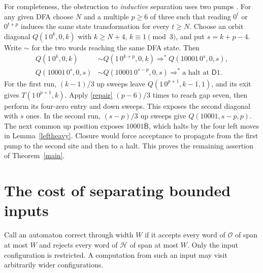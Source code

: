 \documentclass[11pt]{article}
\newcommand{\state}[1]{\mathsf{#1}}
\newcommand{\orb}{\mathcal O}
\newcommand{\halts}{\mathcal H}
\newcommand{\run}{\mathrel{\Rightarrow^{*}}}
\newcommand{\Bleft}{\overline{\state B}}
\begin{document}
For completeness, the obstruction to \emph{inductive} separation uses two pumps \cite[Theorem~1]{prior}. For any given DFA choose \(N\) and a multiple \(p\ge6\) of three such that reading \(0^t\) or \(0^{t+p}\) induces the same state transformation for every \(t\ge N\). Choose an orbit diagonal \(Q(1\,0^k,0,k)\) with \(k\ge N+4\), \(k\equiv1\pmod3\), and put \(s=k+p-4\). Write \(\sim\) for the two words reaching the same DFA state. Then
\begin{align*}
 Q(1\,0^k,0,k)&\sim Q(1\,0^{k+p},0,k)\run Q(10001\,0^s,0,s),\\
 Q(10001\,0^s,0,s)&\sim Q(10001\,0^{s-p},0,s)\run\text{a halt at }\state D1 .
\end{align*}
For the first run, \((k-1)/3\) up sweeps leave \(Q(1\,0^{p+1},k-1,1)\), and its exit gives \(T(1\,0^{p+1},k)\). Apply \eqref{repair} \((p-6)/3\) times to reach gap seven, then perform its four-zero entry and down sweeps. This exposes the second diagonal with \(s\) ones. In the second run, \((s-p)/3\) up sweeps give \(Q(10001,s-p,p)\). The next common up position exposes \(10001\Bleft\), which halts by the four left moves in Lemma~\ref{leftheavy}. Closure would force acceptance to propagate from the first pump to the second site and then to a halt. This proves the remaining assertion of Theorem~\ref{main}.

\section{The cost of separating bounded inputs}\label{width}

Call an automaton correct through width \(W\) if it accepts every word of \(\orb\) of span at most \(W\) and rejects every word of \(\halts\) of span at most \(W\). Only the input configuration is restricted. A computation from such an input may visit arbitrarily wider configurations.
\end{document}
